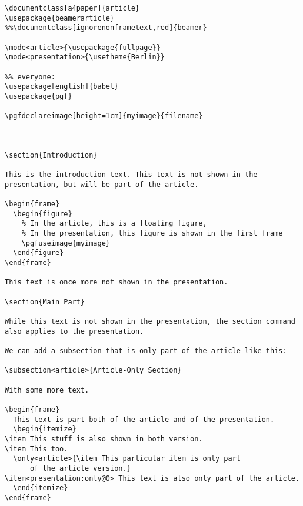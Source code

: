 \begin{verbatim}
\documentclass[a4paper]{article}
\usepackage{beamerarticle}
%%\documentclass[ignorenonframetext,red]{beamer}

\mode<article>{\usepackage{fullpage}}
\mode<presentation>{\usetheme{Berlin}}

%% everyone:
\usepackage[english]{babel}
\usepackage{pgf}

\pgfdeclareimage[height=1cm]{myimage}{filename}



\section{Introduction}

This is the introduction text. This text is not shown in the
presentation, but will be part of the article.

\begin{frame}
  \begin{figure}
    % In the article, this is a floating figure,
    % In the presentation, this figure is shown in the first frame
    \pgfuseimage{myimage}
  \end{figure}
\end{frame}

This text is once more not shown in the presentation.

\section{Main Part}

While this text is not shown in the presentation, the section command
also applies to the presentation.

We can add a subsection that is only part of the article like this:

\subsection<article>{Article-Only Section}

With some more text.

\begin{frame}
  This text is part both of the article and of the presentation.
  \begin{itemize}
\item This stuff is also shown in both version.
\item This too.
  \only<article>{\item This particular item is only part
      of the article version.}
\item<presentation:only@0> This text is also only part of the article.
  \end{itemize}
\end{frame}

\end{verbatim}

